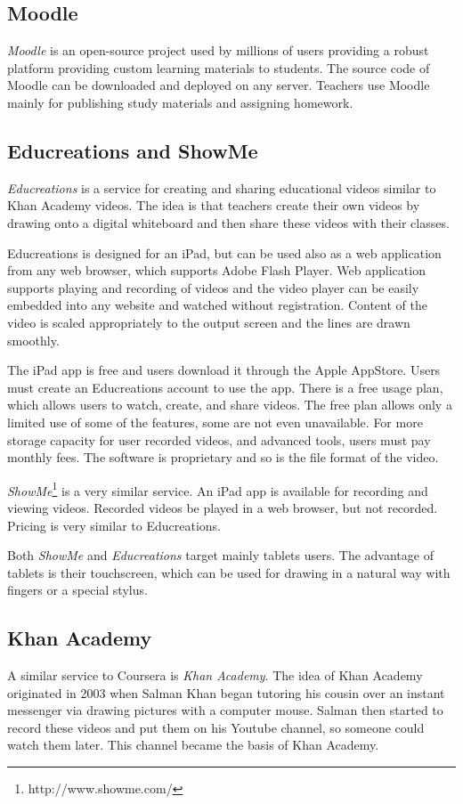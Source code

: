 \subsection{Moodle}
\textit{Moodle} \cite{moodle} is an open-source project used by millions of users \cite{moodle_usage} providing a robust platform providing custom learning materials to students. The source code of Moodle can be downloaded and deployed on any server. Teachers use Moodle mainly for publishing study materials and assigning homework.



\subsection{Educreations and ShowMe}
\textit{Educreations} is a service for creating and sharing educational videos similar to Khan Academy videos. The idea is that teachers create their own videos by drawing onto a digital whiteboard and then share these videos with their classes.

Educreations is designed for an iPad, but can be used also as a web application from any web browser, which supports Adobe Flash Player. Web application supports playing and recording of videos and the video player can be easily embedded into any website and watched without registration. Content of the video is scaled appropriately to the output screen and the lines are drawn smoothly.

The iPad app is free and users download it through the Apple AppStore. Users must create an Educreations account to use the app. There is a free usage plan, which allows users to watch, create, and share videos. The free plan allows only a limited use of some of the features, some are not even unavailable. For more storage capacity for user recorded videos, and advanced tools, users must pay monthly fees. The software is proprietary and so is the file format of the video.

\textit{ShowMe}\footnote{http://www.showme.com/} is a very similar service. An iPad app is available for recording and viewing videos. Recorded videos be played in a web browser, but not recorded. Pricing is very similar to Educreations.

Both \textit{ShowMe} and \textit{Educreations} target mainly tablets users. The advantage of tablets is their touchscreen, which can be used for drawing in a natural way with fingers or a special stylus.



\subsection{Khan Academy}
A similar service to Coursera is \textit{Khan Academy}. The idea of Khan Academy originated in 2003 when Salman Khan began tutoring his cousin over an instant messenger via drawing pictures with a computer mouse. Salman then started to record these videos and put them on his Youtube channel, so someone could watch them later. This channel became the basis of Khan Academy.

